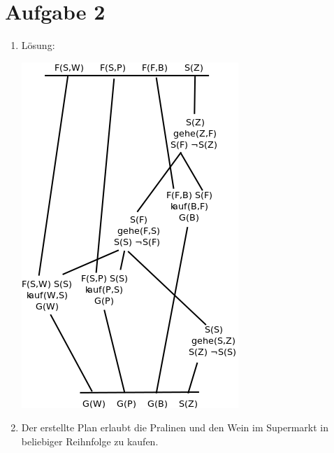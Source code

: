 \documentclass[a4paper,10pt]{article}
\begin{document}
\section*{Aufgabe 2}
\begin{enumerate}[~~a)]
    \item Lösung:\\
    \begin{center} \includegraphics{planning.png} \\ \end{center}
    \item Der erstellte Plan erlaubt die Pralinen und den Wein im Supermarkt in beliebiger Reihnfolge zu kaufen.
\end{enumerate}
\end{document}
